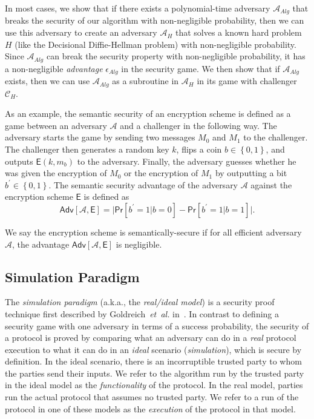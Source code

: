 \documentclass[10pt]{article}
\theoremstyle{plain}
\begin{document}
In most cases, we show that if there exists a polynomial-time adversary
$\mathcal{A}_{Alg}$ that breaks the security of our algorithm with
non-negligible probability, then we can use this adversary to create
an adversary $\mathcal{A}_{H}$ that solves a known hard problem $H$
(like the Decisional Diffie-Hellman problem) with non-negligible probability.
Since $\mathcal{A}_{Alg}$ can break the security property with non-negligible
probability, it has a non-negligible \emph{advantage} $\epsilon_{Alg}$
in the security game. We then show that if $\mathcal{A}_{Alg}$ exists,
then we can use $\mathcal{A}_{Alg}$ as a subroutine in $\mathcal{A}_{H}$
in its game with challenger $\mathcal{C}_{H}$.

As an example, the semantic security of an encryption scheme is defined
as a game between an adversary $\mathcal{A}$ and a challenger in
the following way. The adversary starts the game by sending two messages
$M_{0}$ and $M_{1}$ to the challenger. The challenger then generates
a random key $k$, flips a coin $b\in\left\{ 0,1\right\} $, and outputs
$\mathsf{E}(k,m_{b})$ to the adversary. Finally, the adversary guesses
whether he was given the encryption of $M_{0}$ or the encryption
of $M_{1}$ by outputting a bit $b^{\prime}\in\left\{ 0,1\right\} $.
The semantic security advantage\emph{ }of the adversary $\mathcal{A}$
against the encryption scheme $\mathsf{E}$ is defined as 
\[
\mathsf{Adv}[\mathcal{A},\mathsf{E}]=\big|\mathsf{Pr}[b^{\prime}=1|b=0]-\mathsf{Pr}[b^{\prime}=1|b=1]\big|.
\]

We say the encryption scheme is semantically-secure if for all efficient
adversary $\mathcal{A}$, the advantage $\mathsf{Adv}[\mathcal{A},\mathsf{E}]$
is negligible.

\subsection{Simulation Paradigm}

The \emph{simulation paradigm }(a.k.a., the \emph{real/ideal model})
is a security proof technique first described by Goldreich~\emph{et~al.}
in~\cite{Goldreich:1987:PAM:28395.28420}. In contrast to defining
a security game with one adversary in terms of a success probability,
the security of a protocol is proved by comparing what an adversary
can do in a \emph{real} protocol execution to what it can do in an
\emph{ideal} scenario (\emph{simulation}), which is secure by definition.
In the ideal scenario, there is an incorruptible trusted party to
whom the parties send their inputs. We refer to the algorithm run
by the trusted party in the ideal model as the \emph{functionality}
of the protocol. In the real model, parties run the actual protocol
that assumes no trusted party. We refer to a run of the protocol in
one of these models as the \emph{execution} of the protocol in that
model.
\end{document}

